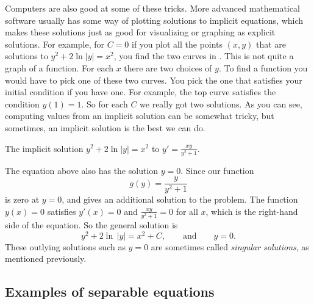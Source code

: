 \documentclass{ximera}
\begin{document}
Computers are also good at some of these tricks. More advanced mathematical software usually has some way of plotting solutions to implicit equations, which makes these solutions just as good for visualizing or graphing as explicit solutions. For example, for $C=0$ if you plot all the points $(x,y)$ that are solutions to $y^2+2\ln|y|=x^2$, you find the two curves in .  This is not quite a graph of a function. For each $x$ there are two choices of $y$. To find a function you would have to pick one of these two curves. You pick the one that satisfies your initial condition if you have one. For example, the top curve satisfies the condition $y(1)=1$. So for each $C$ we really got two solutions. As you can see, computing values from an implicit solution can be somewhat tricky, but sometimes, an implicit solution is the best we can do.

\begin{myfig}
    \capstart
    \caption{The implicit solution $y^2+2\ln|y|=x^2$ to $y'=\frac{xy}{y^2+1}$.\label{implicitsols:fig}}
\end{myfig}


The equation above also has the solution $y=0$. Since our function
\[ 
    g(y) = \frac{y}{y^2 + 1}
\] 
is zero at $y=0$, and gives an additional solution to the problem. The function $y(x) = 0$ satisfies $y'(x) = 0$ and $\frac{xy}{y^2 + 1} = 0$ for all $x$, which is the right-hand side of the equation. So the general solution is 
\begin{equation*}
    y^2 + 2 \ln \, \lvert y \rvert = x^2 + C, \qquad \text{and} \qquad y=0.
\end{equation*}
These outlying solutions such as $y=0$ are sometimes called \emph{singular solutions}, as mentioned previously.

\subsection{Examples of separable equations}
\end{document}
